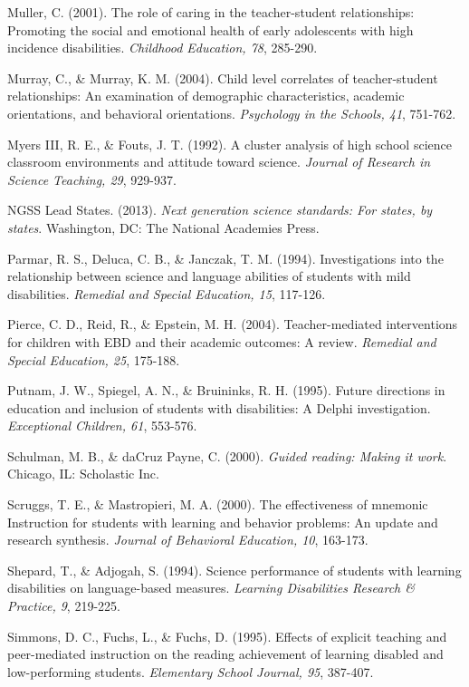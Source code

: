\documentclass[11.5pt]{sig-alternate} %
\begin{document}
Muller, C. (2001). The role of caring in the teacher-student relationships: Promoting the social and emotional health of early adolescents with high incidence disabilities. \textit{Childhood Education, 78}, 285-290. 

Murray, C., \& Murray, K. M. (2004). Child level correlates of teacher-student relationships: An examination of demographic characteristics, academic orientations, and behavioral orientations. \textit{Psychology in the Schools, 41}, 751-762. 

Myers III, R. E., \& Fouts, J. T. (1992). A cluster analysis of high school science classroom environments and attitude toward science. \textit{Journal of Research in Science Teaching, 29}, 929-937. 

NGSS Lead States. (2013). \textit{Next generation science standards: For states, by states}. Washington, DC: The National Academies Press.

Parmar, R. S., Deluca, C. B., \& Janczak, T. M. (1994). Investigations into the relationship between science and language abilities of students with mild disabilities. \textit{Remedial and Special Education, 15}, 117-126.

Pierce, C. D., Reid, R., \& Epstein, M. H. (2004). Teacher-mediated interventions for children with EBD and their academic outcomes: A review. \textit{Remedial and Special Education, 25}, 175-188.

Putnam, J. W., Spiegel, A. N., \& Bruininks, R. H. (1995). Future directions in education and inclusion of students with disabilities: A Delphi investigation. \textit{Exceptional Children, 61}, 553-576.
	
Schulman, M. B., \& daCruz Payne, C. (2000). \textit{Guided reading: Making it work}. Chicago, IL: Scholastic Inc.	

Scruggs, T. E., \& Mastropieri, M. A. (2000). The effectiveness of mnemonic Instruction for students with learning and behavior problems: An update and research synthesis. \textit{Journal of Behavioral Education, 10}, 163-173.

Shepard, T., \& Adjogah, S. (1994). Science performance of students with learning disabilities on language-based measures. \textit{Learning Disabilities Research \& Practice, 9}, 219-225.

Simmons, D. C., Fuchs, L., \& Fuchs, D. (1995). Effects of explicit teaching and peer-mediated instruction on the reading achievement of learning disabled and low-performing students. \textit{Elementary School Journal, 95}, 387-407.
\end{document}
